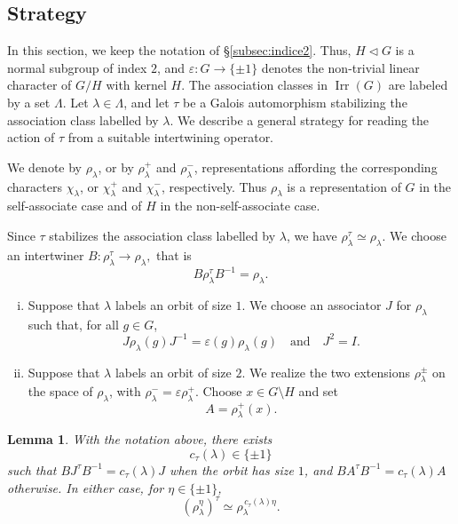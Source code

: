 \documentclass[reqno]{amsart}
\DeclareMathOperator{\Irr}{Irr}
\newtheorem{lemma}[theorem]{Lemma}     %
\theoremstyle{definition}
\begin{document}
\subsection{Strategy}

In this section, we keep the notation of \S\ref{subsec:indice2}. Thus,
$H\triangleleft G$ is a normal subgroup of index $2$, and $
\varepsilon:G\longrightarrow\{\pm1\} $ denotes the non-trivial linear
character of $G/H$ with kernel $H$. The association classes in $\Irr(G)$
are labeled by a set $\Lambda$. Let $\lambda\in\Lambda$, and let $\tau$ be
a Galois automorphism stabilizing the association class labelled by
$\lambda$. We describe a general strategy for reading the action of $\tau$
from a suitable intertwining operator. 
\smallskip

We denote by $\rho_\lambda$, or by $\rho_\lambda^+$ and
$\rho_\lambda^-$, representations affording the corresponding characters
$\chi_\lambda$, or $\chi_\lambda^+$ and $\chi_\lambda^-$, respectively.
Thus $\rho_\lambda$ is a representation of $G$ in the self-associate
case and of $H$ in the non-self-associate case.

Since $\tau$ stabilizes the association class labelled by $\lambda$, we
have $ \rho_\lambda^\tau\simeq\rho_\lambda $. We choose an intertwiner
$
B:\rho_\lambda^\tau\longrightarrow\rho_\lambda,
$
that is 
$$
B\rho_\lambda^\tau B^{-1}=\rho_\lambda.
$$

\begin{enumerate}[(i)]
\item Suppose that $\lambda$ labels an orbit of size $1$. We choose an
associator $J$ for $\rho_\lambda$ such that, for all $g\in G$,
\[
J\rho_\lambda(g)J^{-1}
=
\varepsilon(g)\rho_\lambda(g)
\quad\text{and}\quad
J^2=I.
\]

\item Suppose that $\lambda$ labels an orbit of size $2$. We realize the
two extensions $\rho_\lambda^\pm$ on the space of $\rho_\lambda$, with $
\rho_\lambda^-=\varepsilon\rho_\lambda^+ $. Choose $x\in G\setminus H$ and
set
\[
A=\rho_\lambda^+(x).
\]
\end{enumerate}

\begin{lemma}
\label{lem:galois-index-two}
With the notation above, there exists
\[
c_\tau(\lambda)\in\{\pm1\}
\]
such that  
$
BJ^\tau B^{-1}
=
c_\tau(\lambda)J
$
when the orbit has size $1$, and 
$
BA^\tau B^{-1}
=
c_\tau(\lambda)A
$
otherwise.
In either case, for $\eta\in\{\pm1\}$,
\[
(\rho_\lambda^\eta)^\tau
\simeq
\rho_\lambda^{\,c_\tau(\lambda)\eta}.
\]
\end{lemma}
\end{document}
